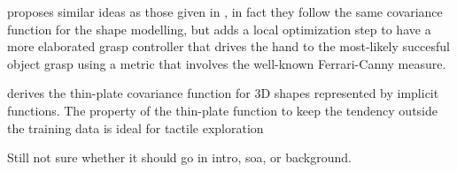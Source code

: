 \citet{Mahler2015Grasp} proposes similar ideas as those given in \citet{Dragiev2011Gaussian}, in fact they follow the same covariance function for the shape modelling, but adds a local optimization step to have a more elaborated grasp controller that drives the hand to the most-likely succesful object grasp using a metric that involves the well-known Ferrari-Canny measure.

\citet{Williams2007Gaussian} derives the thin-plate covariance function for 3D shapes represented by implicit functions. The property of the thin-plate function to keep the tendency outside the training data is ideal for tactile exploration~\citep[Fig.~2]{Williams2007Gaussian}

Still not sure whether it should go in intro, soa, or background.
\citet{Li2016Dexterous} 